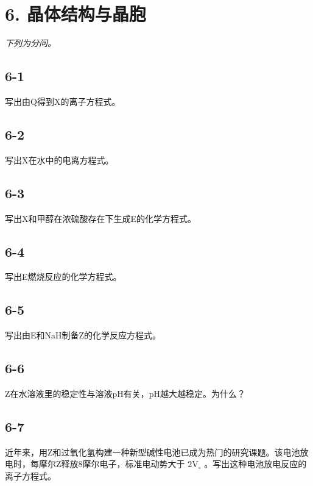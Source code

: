 \section*{6. 晶体结构与晶胞}
\textit{下列为分问。}

\subsection*{6-1}
写出由Q得到X的离⼦⽅程式。

\subsection*{6-2}
写出X在⽔中的电离⽅程式。

\subsection*{6-3}
写出X和甲醇在浓硫酸存在下⽣成E的化学⽅程式。

\subsection*{6-4}
写出E燃烧反应的化学⽅程式。

\subsection*{6-5}
写出由E和NaH制备Z的化学反应⽅程式。

\subsection*{6-6}
Z在⽔溶液⾥的稳定性与溶液pH有关，pH越⼤越稳定。为什么？

\subsection*{6-7}
近年来，⽤Z和过氧化氢构建⼀种新型碱性电池已成为热⻔的研究课题。该电池放电时，每摩尔Z释放8摩尔电⼦，标准电动势⼤于 $2 \mathrm { { V } _ { \circ } }$ 。写出这种电池放电反应的离⼦⽅程式。
